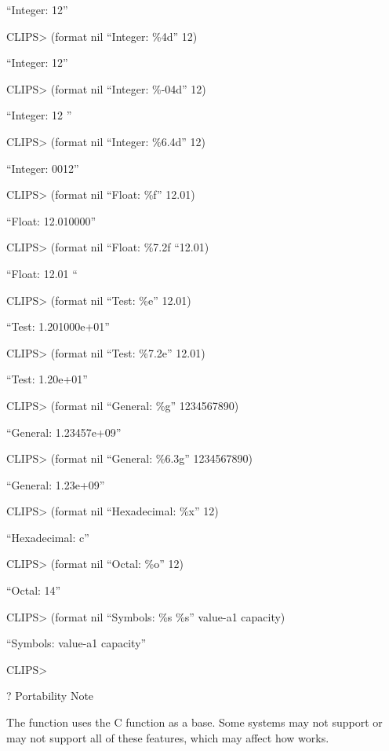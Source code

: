 \documentclass[letterpaper,10pt,english]{sphinxmanual}
\begin{document}
“Integer: \textbar{}12\textbar{}”

CLIPS\textgreater{} (format nil “Integer: \textbar{}\%4d\textbar{}” 12)

“Integer: \textbar{} 12\textbar{}”

CLIPS\textgreater{} (format nil “Integer: \textbar{}\%-04d\textbar{}” 12)

“Integer: \textbar{}12 \textbar{}”

CLIPS\textgreater{} (format nil “Integer: \textbar{}\%6.4d\textbar{}” 12)

“Integer: \textbar{} 0012\textbar{}”

CLIPS\textgreater{} (format nil “Float: \textbar{}\%f\textbar{}” 12.01)

“Float: \textbar{}12.010000\textbar{}”

CLIPS\textgreater{} (format nil “Float: \textbar{}\%7.2f\textbar{} “12.01)

“Float: \textbar{} 12.01\textbar{} “

CLIPS\textgreater{} (format nil “Test: \textbar{}\%e\textbar{}” 12.01)

“Test: \textbar{}1.201000e+01\textbar{}”

CLIPS\textgreater{} (format nil “Test: \textbar{}\%7.2e\textbar{}” 12.01)

“Test: \textbar{}1.20e+01\textbar{}”

CLIPS\textgreater{} (format nil “General: \textbar{}\%g\textbar{}” 1234567890)

“General: \textbar{}1.23457e+09\textbar{}”

CLIPS\textgreater{} (format nil “General: \textbar{}\%6.3g\textbar{}” 1234567890)

“General: \textbar{}1.23e+09\textbar{}”

CLIPS\textgreater{} (format nil “Hexadecimal: \textbar{}\%x\textbar{}” 12)

“Hexadecimal: \textbar{}c\textbar{}”

CLIPS\textgreater{} (format nil “Octal: \textbar{}\%o\textbar{}” 12)

“Octal: \textbar{}14\textbar{}”

CLIPS\textgreater{} (format nil “Symbols: \textbar{}\%s\textbar{} \textbar{}\%s\textbar{}” value-a1 capacity)

“Symbols: \textbar{}value-a1\textbar{} \textbar{}capacity\textbar{}”

CLIPS\textgreater{}

? Portability Note

The  function uses the C function  as a base. Some
systems may not support  or may not support all of these
features, which may affect how  works.
\end{document}
